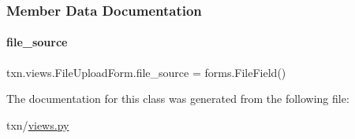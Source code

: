 \subsubsection{Member Data Documentation}
\mbox{\label{classtxn_1_1views_1_1FileUploadForm_a9d4625c52738a29aa32d017757fe0b0e}} 
\paragraph{\texorpdfstring{file\+\_\+source}{file\_source}}
{\footnotesize\ttfamily txn.\+views.\+File\+Upload\+Form.\+file\+\_\+source = forms.\+File\+Field()\hspace{0.3cm}{\ttfamily [static]}}



The documentation for this class was generated from the following file\+:\begin{DoxyCompactItemize}
\item 
txn/\hyperlink{txn_2views_8py}{views.\+py}\end{DoxyCompactItemize}
